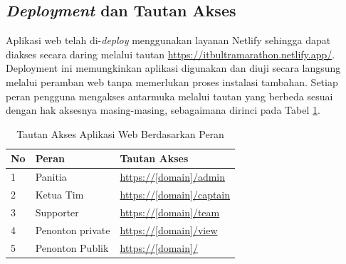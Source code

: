 \subsection{\textit{Deployment} dan Tautan Akses}
\label{sec:impl-deployment}

Aplikasi web telah di-\textit{deploy} menggunakan layanan Netlify sehingga dapat diakses secara daring melalui tautan \url{https://itbultramarathon.netlify.app/}. Deployment ini memungkinkan aplikasi digunakan dan diuji secara langsung melalui peramban web tanpa memerlukan proses instalasi tambahan.
Setiap peran pengguna mengakses antarmuka melalui tautan yang berbeda sesuai dengan hak aksesnya masing-masing, sebagaimana dirinci pada Tabel \ref{tab:deployment-links}.

\begin{table}[H]
    \centering
    \caption{Tautan Akses Aplikasi Web Berdasarkan Peran}
    \label{tab:deployment-links}
    \begin{tabular}{|l|l|p{6cm}|}
        \hline
        \textbf{No} & \textbf{Peran} & \textbf{Tautan Akses} \\ \hline
        1 & Panitia & \url{https://[domain]/admin} \\ \hline
        2 & Ketua Tim & \url{https://[domain]/captain} \\ \hline
        3 & Supporter & \url{https://[domain]/team} \\ \hline
        4 & Penonton private & \url{https://[domain]/view} \\ \hline
        5 & Penonton Publik & \url{https://[domain]/} \\ \hline
    \end{tabular}
\end{table}
